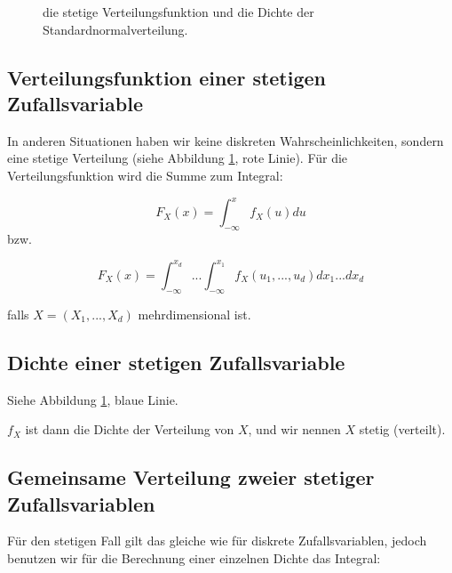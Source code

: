 {    \begin{figure}
    \centering
        \begin{tikzpicture}
            
        \end{tikzpicture}
        \caption{die stetige Verteilungsfunktion und die Dichte der Standardnormalverteilung.}
        \label{fig:stetige_verteilung_dichte}
    \end{figure}

    \subsection{Verteilungsfunktion einer stetigen Zufallsvariable}

    In anderen Situationen haben wir keine diskreten Wahrscheinlichkeiten, sondern eine stetige Verteilung (siehe Abbildung \ref{fig:stetige_verteilung_dichte}, rote Linie). Für die Verteilungsfunktion wird die Summe zum Integral:

    \[
        F_{X}\left(x\right)=\int_{-{\infty}}^{x}{f_{X}(u)}du
    \]
    bzw.

    \begin{equation*}
    F_{X}\left(x\right)=\int_{-\infty}^{x_d}{... \int_{-\infty}^{x_1}{f_{X}\left(u_{1},... ,u_{d}\right)}dx_{1}... }dx_{d}
    \end{equation*}

    falls $X=\left(X_{1},...,X_{d}\right)$ mehrdimensional ist.

     \subsection{Dichte einer stetigen Zufallsvariable}
    Siehe Abbildung \ref{fig:stetige_verteilung_dichte}, blaue Linie.

     $f_{X}$ ist dann die Dichte der Verteilung von $X$, und wir nennen $X$ stetig (verteilt).


     \subsection{Gemeinsame Verteilung zweier stetiger Zufallsvariablen}
    Für den stetigen Fall gilt das gleiche wie für diskrete Zufallsvariablen, jedoch
    benutzen wir für die Berechnung einer einzelnen Dichte das Integral:

}
